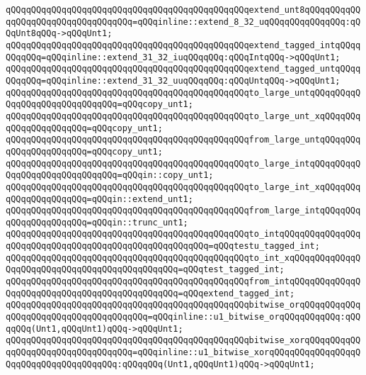 \verb|qQQqqQQqqQQqqQQqqQQqqQQqqQQqqQQqqQQqqQQqqQQqqQQqextend_unt8qQQqqQQqqQQqqQQqqQQqqQQqqQQqqQQqqQQq=qQQqinline::extend_8_32_uqQQqqQQqqQQqqQQq:qQQqUnt8qQQq->qQQqUnt1;|\newline
\verb|qQQqqQQqqQQqqQQqqQQqqQQqqQQqqQQqqQQqqQQqqQQqqQQqextend_tagged_intqQQqqQQqqQQq=qQQqinline::extend_31_32_iuqQQqqQQq:qQQqIntqQQq->qQQqUnt1;|\newline
\verb|qQQqqQQqqQQqqQQqqQQqqQQqqQQqqQQqqQQqqQQqqQQqqQQqextend_tagged_untqQQqqQQqqQQq=qQQqinline::extend_31_32_uuqQQqqQQq:qQQqUntqQQq->qQQqUnt1;|\newline
\newline
\verb|qQQqqQQqqQQqqQQqqQQqqQQqqQQqqQQqqQQqqQQqqQQqqQQqto_large_untqQQqqQQqqQQqqQQqqQQqqQQqqQQqqQQq=qQQqcopy_unt1;|\newline
\verb|qQQqqQQqqQQqqQQqqQQqqQQqqQQqqQQqqQQqqQQqqQQqqQQqto_large_unt_xqQQqqQQqqQQqqQQqqQQqqQQq=qQQqcopy_unt1;|\newline
\verb|qQQqqQQqqQQqqQQqqQQqqQQqqQQqqQQqqQQqqQQqqQQqqQQqfrom_large_untqQQqqQQqqQQqqQQqqQQqqQQq=qQQqcopy_unt1;|\newline
\verb|qQQqqQQqqQQqqQQqqQQqqQQqqQQqqQQqqQQqqQQqqQQqqQQqto_large_intqQQqqQQqqQQqqQQqqQQqqQQqqQQqqQQq=qQQqin::copy_unt1;|\newline
\verb|qQQqqQQqqQQqqQQqqQQqqQQqqQQqqQQqqQQqqQQqqQQqqQQqto_large_int_xqQQqqQQqqQQqqQQqqQQqqQQq=qQQqin::extend_unt1;|\newline
\verb|qQQqqQQqqQQqqQQqqQQqqQQqqQQqqQQqqQQqqQQqqQQqqQQqfrom_large_intqQQqqQQqqQQqqQQqqQQqqQQq=qQQqin::trunc_unt1;|\newline
\verb|qQQqqQQqqQQqqQQqqQQqqQQqqQQqqQQqqQQqqQQqqQQqqQQqto_intqQQqqQQqqQQqqQQqqQQqqQQqqQQqqQQqqQQqqQQqqQQqqQQqqQQqqQQq=qQQqtestu_tagged_int;|\newline
\verb|qQQqqQQqqQQqqQQqqQQqqQQqqQQqqQQqqQQqqQQqqQQqqQQqto_int_xqQQqqQQqqQQqqQQqqQQqqQQqqQQqqQQqqQQqqQQqqQQqqQQq=qQQqtest_tagged_int;|\newline
\verb|qQQqqQQqqQQqqQQqqQQqqQQqqQQqqQQqqQQqqQQqqQQqqQQqfrom_intqQQqqQQqqQQqqQQqqQQqqQQqqQQqqQQqqQQqqQQqqQQqqQQq=qQQqextend_tagged_int;|\newline
\newline
\verb|qQQqqQQqqQQqqQQqqQQqqQQqqQQqqQQqqQQqqQQqqQQqqQQqbitwise_orqQQqqQQqqQQqqQQqqQQqqQQqqQQqqQQqqQQqqQQq=qQQqinline::u1_bitwise_orqQQqqQQqqQQq:qQQqqQQq(Unt1,qQQqUnt1)qQQq->qQQqUnt1;|\newline
\verb|qQQqqQQqqQQqqQQqqQQqqQQqqQQqqQQqqQQqqQQqqQQqqQQqbitwise_xorqQQqqQQqqQQqqQQqqQQqqQQqqQQqqQQqqQQq=qQQqinline::u1_bitwise_xorqQQqqQQqqQQqqQQqqQQqqQQqqQQqqQQqqQQqqQQq:qQQqqQQq(Unt1,qQQqUnt1)qQQq->qQQqUnt1;|\newline
